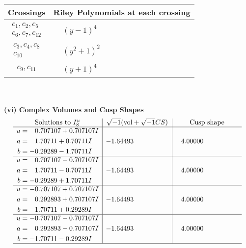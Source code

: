 \documentclass[1p]{elsarticle_modified}
\theoremstyle{definition}
\newcommand{\I}{\sqrt{-1}}
\begin{document}
\begin{tabular}{m{50pt}|m{274pt}}
Crossings & \hspace{64pt}Riley Polynomials at each crossing \\
\hline $$\begin{aligned}c_{1},c_{2},c_{5}\\c_{6},c_{7},c_{12}\end{aligned}$$&$\begin{aligned}
&(y-1)^4
\end{aligned}$\\
\hline $$\begin{aligned}c_{3},c_{4},c_{8}\\c_{10}\end{aligned}$$&$\begin{aligned}
&(y^2+1)^2
\end{aligned}$\\
\hline $$\begin{aligned}c_{9},c_{11}\end{aligned}$$&$\begin{aligned}
&(y+1)^4
\end{aligned}$\\
\hline
\end{tabular}\\~\\
\newpage\flushleft \textbf{(vi) Complex Volumes and Cusp Shapes}
$$\begin{array}{c|c|c}  
\text{Solutions to }I^u_{8}& \I (\text{vol} + \sqrt{-1}CS) & \text{Cusp shape}\\
 \hline 
\begin{aligned}
u &= \phantom{-}0.707107 + 0.707107 I \\
a &= \phantom{-}1.70711 + 0.70711 I \\
b &= -0.29289 - 1.70711 I\end{aligned}
 & -1.64493\phantom{ +0.000000I} & \phantom{-}4.00000\phantom{ +0.000000I} \\ \hline\begin{aligned}
u &= \phantom{-}0.707107 - 0.707107 I \\
a &= \phantom{-}1.70711 - 0.70711 I \\
b &= -0.29289 + 1.70711 I\end{aligned}
 & -1.64493\phantom{ +0.000000I} & \phantom{-}4.00000\phantom{ +0.000000I} \\ \hline\begin{aligned}
u &= -0.707107 + 0.707107 I \\
a &= \phantom{-}0.292893 + 0.707107 I \\
b &= -1.70711 + 0.29289 I\end{aligned}
 & -1.64493\phantom{ +0.000000I} & \phantom{-}4.00000\phantom{ +0.000000I} \\ \hline\begin{aligned}
u &= -0.707107 - 0.707107 I \\
a &= \phantom{-}0.292893 - 0.707107 I \\
b &= -1.70711 - 0.29289 I\end{aligned}
 & -1.64493\phantom{ +0.000000I} & \phantom{-}4.00000\phantom{ +0.000000I}\\
 \hline 
 \end{array}$$\newpage\newpage\renewcommand{\arraystretch}{1}
\end{document}
